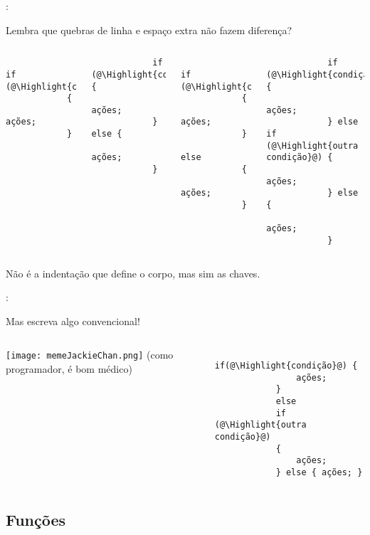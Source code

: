 \begin{frame}[fragile]{\insertsection: \insertsubsection}

	Lembra que quebras de linha e espaço extra não fazem diferença?
	\begin{columns}[t]
		\begin{verbatim}
			if (@\Highlight{condição}@)
			{
				ações;
			}
		\end{verbatim}

		\vspace{-\medskipamount}
		\begin{verbatim}
			if (@\Highlight{condição}@) {
				ações;
			} else {
				ações;
			}
		\end{verbatim}

		\begin{verbatim}
			if (@\Highlight{condição}@)
			{
				ações;
			}
			else
			{
				ações;
			}
		\end{verbatim}

		\begin{verbatim}
			if (@\Highlight{condição}@) {
				ações;
			} else if (@\Highlight{outra condição}@) {
				ações;
			} else {
				ações;
			}
		\end{verbatim}
	\end{columns}
	Não é a indentação que define o corpo, mas sim as chaves.

\end{frame}


\begin{frame}[fragile]{\insertsection: \insertsubsection}

	Mas escreva algo convencional!
	\begin{columns}[T]
	\centering
		\texttt{[image: memeJackieChan.png]}
		{\small (como programador, é bom médico)}

		\begin{verbatim}
			if(@\Highlight{condição}@) {
				ações;
			}
			else
			if (@\Highlight{outra condição}@)
			{
				ações;
			} else { ações; }
		\end{verbatim}
	\end{columns}

\end{frame}


\subsection{Funções}


